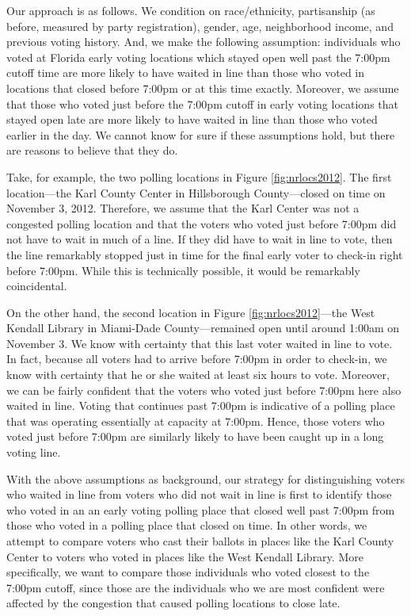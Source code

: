 \documentclass[12pt,titlepage]{article}
\begin{document}
Our approach is as follows.  We condition on race/ethnicity,
partisanship (as before, measured by party registration), gender, age, neighborhood income,
and previous voting history.  And, we make the following assumption:
individuals who voted at Florida early voting locations which stayed
open well past the 7:00pm cutoff time are more likely to have waited
in line than those who voted in locations that closed before 7:00pm or
at this time exactly.  Moreover, we assume that those who voted just
before the 7:00pm cutoff in early voting locations that stayed open
late are more likely to have waited in line than those who voted
earlier in the day.  We cannot know for sure if these assumptions
hold, but there are reasons to believe that they do.

Take, for example, the two polling locations in Figure
\ref{fig:nrlocs2012}.  The first location---the Karl County Center in
Hillsborough County---closed on time on November 3, 2012.  Therefore,
we assume that the Karl Center was not a congested polling location
and that the voters who voted just before 7:00pm did not have to wait
in much of a line.  If they did have to wait in line to vote, then the
line remarkably stopped just in time for the final early voter to
check-in right before 7:00pm.  While this is technically possible, it
would be remarkably coincidental.

On the other hand, the second location in Figure
\ref{fig:nrlocs2012}---the West Kendall Library in Miami-Dade
County---remained open until around 1:00am on November 3.  We know
with certainty that this last voter waited in line to vote.  In fact,
because all voters had to arrive before 7:00pm in order to check-in,
we know with certainty that he or she waited at least six hours to
vote.  Moreover, we can be fairly confident that the voters who voted
just before 7:00pm here also waited in line.  Voting that continues
past 7:00pm is indicative of a polling place that was operating
essentially at capacity at 7:00pm.  Hence, those voters who voted just
before 7:00pm are similarly likely to have been caught up in a long
voting line.

With the above assumptions as background, our strategy for
distinguishing voters who waited in line from voters who did not wait
in line is first to identify those who voted in an an early voting
polling place that closed well past 7:00pm from those who voted in a
polling place that closed on time.  In other words, we attempt to
compare voters who cast their ballots in places like the Karl County
Center to voters who voted in places like the West Kendall Library.
More specifically, we want to compare those individuals who voted
closest to the 7:00pm cutoff, since those are the individuals who we
are most confident were affected by the congestion that caused polling
locations to close late.
 
\end{document}
